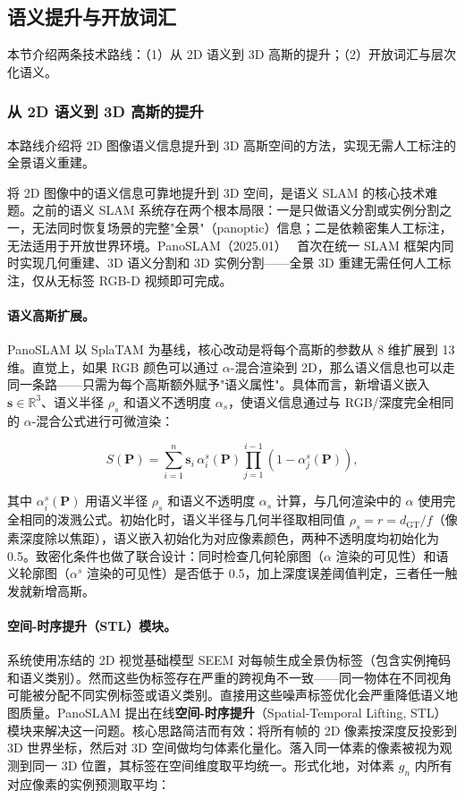 \subsection{语义提升与开放词汇}
\label{ss:15_8}

本节介绍两条技术路线：（1）从 2D 语义到 3D 高斯的提升；（2）开放词汇与层次化语义。

\subsubsection{从 2D 语义到 3D 高斯的提升}

本路线介绍将 2D 图像语义信息提升到 3D 高斯空间的方法，实现无需人工标注的全景语义重建。

将 2D 图像中的语义信息可靠地提升到 3D 空间，是语义 SLAM 的核心技术难题。之前的语义 SLAM 系统存在两个根本局限：一是只做语义分割或实例分割之一，无法同时恢复场景的完整"全景"（panoptic）信息；二是依赖密集人工标注，无法适用于开放世界环境。PanoSLAM（2025.01）~\cite{2501_00352} 首次在统一 SLAM 框架内同时实现几何重建、3D 语义分割和 3D 实例分割——全景 3D 重建无需任何人工标注，仅从无标签 RGB-D 视频即可完成。

\paragraph{语义高斯扩展。}
PanoSLAM 以 SplaTAM 为基线，核心改动是将每个高斯的参数从 8 维扩展到 13 维。直觉上，如果 RGB 颜色可以通过 $\alpha$-混合渲染到 2D，那么语义信息也可以走同一条路——只需为每个高斯额外赋予"语义属性"。具体而言，新增语义嵌入 $\mathbf{s} \in \mathbb{R}^3$、语义半径 $\rho_s$ 和语义不透明度 $\alpha_s$，使语义信息通过与 RGB/深度完全相同的 $\alpha$-混合公式进行可微渲染：

\begin{equation*}
S(\mathbf{P}) = \sum_{i=1}^{n} \mathbf{s}_i \, \alpha_i^s(\mathbf{P}) \prod_{j=1}^{i-1}(1 - \alpha_j^s(\mathbf{P})),
\end{equation*}

其中 $\alpha_i^s(\mathbf{P})$ 用语义半径 $\rho_s$ 和语义不透明度 $\alpha_s$ 计算，与几何渲染中的 $\alpha$ 使用完全相同的泼溅公式。初始化时，语义半径与几何半径取相同值 $\rho_s = r = d_{\mathrm{GT}}/f$（像素深度除以焦距），语义嵌入初始化为对应像素颜色，两种不透明度均初始化为 0.5。致密化条件也做了联合设计：同时检查几何轮廓图（$\alpha$ 渲染的可见性）和语义轮廓图（$\alpha^s$ 渲染的可见性）是否低于 0.5，加上深度误差阈值判定，三者任一触发就新增高斯。

\paragraph{空间-时序提升（STL）模块。}
系统使用冻结的 2D 视觉基础模型 SEEM 对每帧生成全景伪标签（包含实例掩码和语义类别）。然而这些伪标签存在严重的跨视角不一致——同一物体在不同视角可能被分配不同实例标签或语义类别。直接用这些噪声标签优化会严重降低语义地图质量。PanoSLAM 提出在线\textbf{空间-时序提升}（Spatial-Temporal Lifting, STL）模块来解决这一问题。核心思路简洁而有效：将所有帧的 2D 像素按深度反投影到 3D 世界坐标，然后对 3D 空间做均匀体素化量化。落入同一体素的像素被视为观测到同一 3D 位置，其标签在空间维度取平均统一。形式化地，对体素 $g_n$ 内所有对应像素的实例预测取平均：

